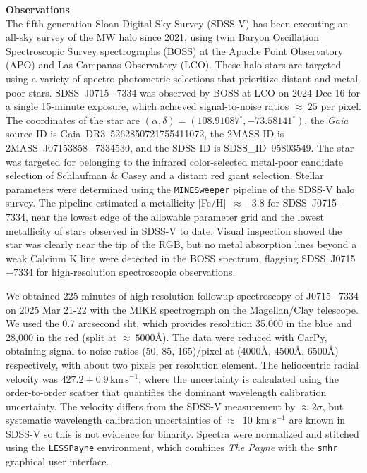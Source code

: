 \documentclass{natureprintstyle}
\newcommand{\code}[1]{\texttt{#1}\xspace}
\newcommand{\unit}[1]{\ensuremath{\mathrm{\,#1}}\xspace}
\newcommand{\kms}{\unit{km\,s^{-1}}}
\newcommand{\umpstarsdss}{SDSS~J0715$-$7334\xspace}
\newcommand{\umpstar}{J0715$-$7334\xspace}
\newcommand{\umpstartmass}{2MASS~J07153858$-$7334530\xspace}
\newcommand{\umpstargaia}{Gaia~DR3~5262850721755411072\xspace}
\newcommand{\umpstarsdssid}{SDSS\_ID~95803549\xspace}
\begin{document}
\noindent
{\bf Observations}
\\
\noindent
The fifth-generation Sloan Digital Sky Survey (SDSS-V\cite{Kollmeier2026}) has been executing an all-sky survey of the MW halo since 2021, using twin Baryon Oscillation Spectroscopic Survey spectrographs (BOSS\cite{Smee2013}) at the Apache Point Observatory (APO) and Las Campanas Observatory (LCO). 
These halo stars are targeted using a variety of spectro-photometric selections that prioritize distant and metal-poor stars\cite{Chandra2025}. 
\umpstarsdss{} was observed by BOSS at LCO on 2024 Dec 16 for a single 15-minute exposure, which achieved signal-to-noise ratios ${\approx}~25$ per pixel.
The coordinates of the star are $(\alpha,\delta) = (108.91087^\circ, -73.58141^\circ)$, the \textit{Gaia} source ID is \umpstargaia, the 2MASS ID is \umpstartmass, and the SDSS ID is \umpstarsdssid.
The star was targeted for belonging to the infrared color-selected metal-poor candidate selection of Schlaufman \& Casey\cite{Schlaufman2014} and a distant red giant selection\cite{Conroy2018, Conroy2021, Chandra2023b, Chandra2025}. 
Stellar parameters were determined using the \code{MINESweeper} pipeline of the SDSS-V halo survey\cite{Cargile2020, Chandra2025}. 
The pipeline estimated a metallicity [Fe/H]~$\approx -3.8$ for \umpstarsdss{}, near the lowest edge of the allowable parameter grid and the lowest metallicity of stars observed in SDSS-V to date. 
Visual inspection showed the star was clearly near the tip of the RGB, but no metal absorption lines beyond a weak Calcium K line were detected in the BOSS spectrum, flagging \umpstarsdss{} for high-resolution spectroscopic observations. 

We obtained 225 minutes of high-resolution followup spectroscopy of \umpstar on 2025 Mar 21-22 with the MIKE spectrograph\cite{Bernstein2003} on the Magellan/Clay telescope.
We used the 0.7 arcsecond slit, which provides resolution 35,000 in the blue and 28,000 in the red (split at ${\approx}~5000${\AA}).
The data were reduced with CarPy\cite{Kelson2003}, obtaining signal-to-noise ratios (50, 85, 165)/pixel at (4000{\AA}, 4500{\AA}, 6500{\AA}) respectively, with about two pixels per resolution element.
The heliocentric radial velocity was $427.2 \pm 0.9 \kms$, where the uncertainty is calculated using the order-to-order scatter that quantifies the dominant wavelength calibration uncertainty\cite{Ji2020}.
The velocity differs from the SDSS-V measurement by ${\approx}2\sigma$, but systematic wavelength calibration uncertainties of ${\approx}$~10 km s$^{-1}$ are known in SDSS-V\cite{Chandra2025} so this is not evidence for binarity.
Spectra were normalized and stitched using the \code{LESSPayne} environment\cite{Ji2025ascl},
which combines \textit{The Payne}\cite{Ting2019} with the \code{smhr} graphical user interface\cite{Casey2014}.
\end{document}
